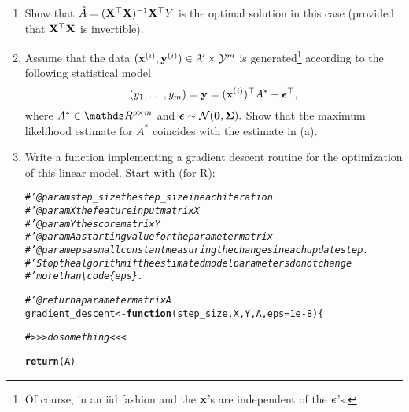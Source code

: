 \documentclass[a4paper]{article}
\makeatletter
\newcommand{\hlnum}[1]{\textcolor[rgb]{0.686,0.059,0.569}{#1}}%
\newcommand{\hlcom}[1]{\textcolor[rgb]{0.678,0.584,0.686}{\textit{#1}}}%
\newcommand{\hlstd}[1]{\textcolor[rgb]{0.345,0.345,0.345}{#1}}%
\newcommand{\hlkwa}[1]{\textcolor[rgb]{0.161,0.373,0.58}{\textbf{#1}}}%
\newcommand{\hlkwb}[1]{\textcolor[rgb]{0.69,0.353,0.396}{#1}}%
\newcommand{\hlkwc}[1]{\textcolor[rgb]{0.333,0.667,0.333}{#1}}%
\newcommand{\hlkwd}[1]{\textcolor[rgb]{0.737,0.353,0.396}{\textbf{#1}}}%
\newenvironment{kframe}{%
 \def\at@end@of@kframe{}%
 \ifinner\ifhmode%
  \def\at@end@of@kframe{\end{minipage}}%
  \begin{minipage}{\columnwidth}%
 \fi\fi%
 \def\FrameCommand##1{\hskip\@totalleftmargin \hskip-\fboxsep
 \colorbox{shadecolor}{##1}\hskip-\fboxsep
     \hskip-\linewidth \hskip-\@totalleftmargin \hskip\columnwidth}%
 \MakeFramed {\advance\hsize-\width
   \@totalleftmargin\z@ \linewidth\hsize
   \@setminipage}}%
 {\par\unskip\endMakeFramed%
 \at@end@of@kframe}
\newenvironment{knitrout}{}{} %
\makeatother
\begin{document}
{	\begin{enumerate}
%	
	\item Show that $\hat A = (\mathbf{X}^\top \mathbf{X})^{-1} \mathbf{X}^\top Y$ is the optimal solution in this case (provided that $\mathbf{X}^\top \mathbf{X}$ is invertible).
%	
	\item Assume that the data $(\mathbf{x}^{(i)},\mathbf{y}^{(i)}) \in \mathcal{X} \times \mathcal{Y}^m$ is generated\footnote{Of course, in an iid fashion and the $\mathbf{x}$'s are independent of the $\bm{\epsilon}$'s.} according to the following statistical model
%	
	$$	(y_1,\ldots,y_m) =	\mathbf{y} = (\mathbf{x}^{(i)})^\top A^* + \bm{\epsilon}^\top,		$$
%	
	where $A^* \in \R^{p\times m}$ and $\bm{\epsilon} \sim \mathcal{N}(\bm{0},\bm{\Sigma}).$
%
	Show that the maximum likelihood estimate for $A^*$ coincides with the estimate in (a). 
	\item Write a function implementing a gradient descent routine for the optimization of this linear model. Start with (for R):
%	
\begin{knitrout}
\color{fgcolor}\begin{kframe}
\begin{alltt}
\hlcom{#' @param step_size the step_size in each iteration}
\hlcom{#' @param X the feature input matrix X}
\hlcom{#' @param Y the score matrix Y}
\hlcom{#' @param A a starting value for the parameter matrix}
\hlcom{#' @param eps a small constant measuring the changes in each update step. }
\hlcom{#' Stop the algorithm if the estimated model parameters do not change}
\hlcom{#' more than \textbackslash{}code\{eps\}.}

\hlcom{#' @return a parameter matrix A}
\hlstd{gradient_descent} \hlkwb{<-} \hlkwa{function}\hlstd{(}\hlkwc{step_size}\hlstd{,} \hlkwc{X}\hlstd{,} \hlkwc{Y}\hlstd{,} \hlkwc{A}\hlstd{,} \hlkwc{eps} \hlstd{=} \hlnum{1e-8}\hlstd{)\{}

  \hlcom{# >>> do something <<<}

  \hlkwd{return}\hlstd{(A)}


\end{alltt}
\end{kframe}
\end{knitrout}
\end{enumerate}}
\end{document}
